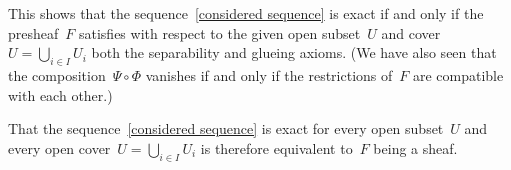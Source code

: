 This shows that the sequence~\eqref{considered sequence} is exact if and only if the presheaf~$F$ satisfies with respect to the given open subset~$U$ and cover~$U = \bigcup_{i \in I} U_i$ both the separability and glueing axioms.
(We have also seen that the composition~$\Psi \circ \Phi$ vanishes if and only if the restrictions of~$F$ are compatible with each other.)

That the sequence~\eqref{considered sequence} is exact for every open subset~$U$ and every open cover~$U = \bigcup_{i \in I} U_i$ is therefore equivalent to~$F$ being a sheaf.




